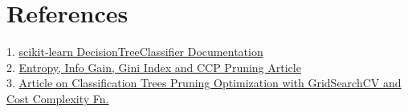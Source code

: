 \documentclass{article}
\begin{document}
  \section{References}
  
  1. \href{https://scikit-learn.org/stable/modules/generated/sklearn.tree.DecisionTreeClassifier.html}{scikit-learn DecisionTreeClassifier Documentation}\\
  2. \href{https://towardsdatascience.com/decision-trees-explained-entropy-information-gain-gini-index-ccp-pruning-4d78070db36c}{Entropy, Info Gain, Gini Index and CCP Pruning Article}\\
  3. \href{https://vzhang1999.medium.com/classification-tree-growing-and-pruning-with-python-code-grid-search-cost-complexity-function-b2e45e33a1a4}{Article on Classification Trees Pruning Optimization with GridSearchCV and Cost Complexity Fn.}
\end{document}
